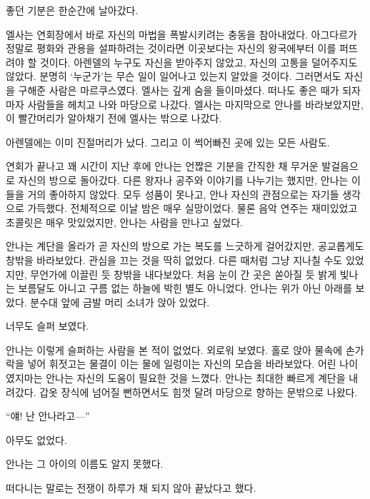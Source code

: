 좋던 기분은 한순간에 날아갔다.

엘사는 연회장에서 바로 자신의 마법을 폭발시키려는 충동을 참아내었다. 아그다르가 정말로 평화와 관용을 설파하려는 것이라면 이곳보다는 자신의 왕국에부터 이를 퍼뜨려야 할 것이다. 아렌델의 누구도 자신을 받아주지 않았고, 자신의 고통을 덜어주지도 않았다. 분명히 `누군가'는 무슨 일이 일어나고 있는지 알았을 것이다. 그러면서도 자신을 구해준 사람은 마르쿠스였다. 엘사는 깊게 숨을 들이마셨다. 떠나도 좋은 때가 되자마자 사람들을 헤치고 나와 마당으로 나갔다. 엘사는 마지막으로 안나를 바라보았지만, 이 빨간머리가 알아채기 전에 엘사는 밖으로 나갔다.

아렌델에는 이미 진절머리가 났다. 그리고 이 썩어빠진 곳에 있는 모든 사람도.

\textbreak

연회가 끝나고 꽤 시간이 지난 후에 안나는 언짢은 기분을 간직한 채 무거운 발걸음으로 자신의 방으로 돌아갔다. 다른 왕자나 공주와 이야기를 나누기는 했지만, 안나는 이들을 거의 좋아하지 않았다. 모두 성품이 못나고, 안나 자신의 관점으로는 자기들 생각으로 가득했다. 전체적으로 이날 밤은 매우 실망이었다. 물론 음악 연주는 재미있었고 초콜릿은 매우 맛있었지만, 안나는 사람을 만나고 싶었다. 

안나는 계단을 올라가 곧 자신의 방으로 가는 복도를 느긋하게 걸어갔지만, 공교롭게도 창밖을 바라보았다. 관심을 끄는 것을 딱히 없었다. 다른 때처럼 그냥 지나칠 수도 있었지만, 무언가에 이끌린 듯 창밖을 내다보았다. 처음 눈이 간 곳은 쏟아질 듯 밝게 빛나는 보름달도 아니고 구름 없는 하늘에 박힌 별도 아니었다. 안나는 위가 아닌 아래를 보았다. 분수대 앞에 금발 머리 소녀가 앉아 있었다.

너무도 슬퍼 보였다.

안나는 이렇게 슬퍼하는 사람을 본 적이 없었다. 외로워 보였다. 홀로 앉아 물속에 손가락을 넣어 휘젓고는 물결이 이는 물에 일렁이는 자신의 모습을 바라보았다. 어린 나이였지마는 안나는 자신의 도움이 필요한 것을 느꼈다. 안나는 최대한 빠르게 계단을 내려갔다. 갑옷 장식에 넘어질 뻔하면서도 힘껏 달려 마당으로 향하는 문밖으로 나왔다.

``얘! 난 안나라고—''

아무도 없었다.

안나는 그 아이의 이름도 알지 못했다.

\textbreak

떠다니는 말로는 전쟁이 하루가 채 되지 않아 끝났다고 했다.

